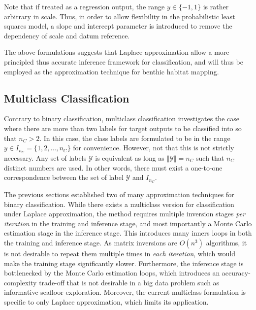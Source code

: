 				Note that if treated as a regression output, the range $y \in \{-1, 1\}$ is rather arbitrary in scale. Thus, in order to allow flexibility in the probabilistic least squares model, a slope and intercept parameter is introduced to remove the dependency of scale and datum reference.
				
				The above formulations suggests that Laplace approximation allow a more principled thus accurate inference framework for classification, and will thus be employed as the approximation technique for benthic habitat mapping. 
			
		\subsection{Multiclass Classification}
		\label{BenthicHabitatMapping:Classification:MulticlassClassification}
		
			Contrary to binary classification, multiclass classification investigates the case where there are more than two labels for target outputs to be classified into so that $n_{C} > 2$. In this case, the class labels are formulated to be in the range $y \in I_{n_{C}} = \{1, 2, \dots, n_{C}\}$ for convenience. However, not that this is not strictly necessary. Any set of labels $\mathcal{Y}$ is equivalent as long as $\Vert \mathcal{Y} \Vert = n_{C}$ such that $n_{C}$ distinct numbers are used. In other words, there must exist a one-to-one correspondence between the set of label $\mathcal{Y}$ and $I_{n_{C}}$.
			
			The previous sections established two of many approximation techniques for binary classification. While there exists a multiclass version for classification under Laplace approximation, the method requires multiple inversion stages \textit{per iteration} in the training and inference stage, and most importantly a Monte Carlo estimation stage in the inference stage. This introduces many inners loops in both the training and inference stage. As matrix inversions are $O(n^{3})$ algorithms, it is not desirable to repeat them multiple times in \textit{each iteration}, which would make the training stage significantly slower. Furthermore, the inference stage is bottlenecked by the Monte Carlo estimation loops, which introduces an accuracy-complexity trade-off that is not desirable in a big data problem such as informative seafloor exploration. Moreover, the current multiclass formulation is specific to only Laplace approximation, which limits its application.
			
